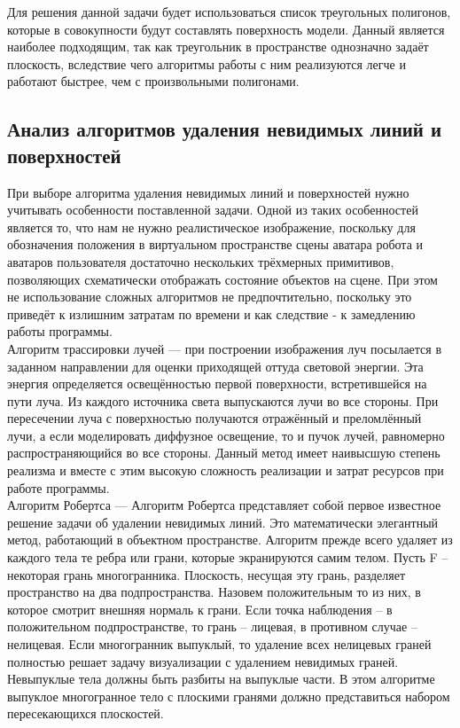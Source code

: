 Для решения данной задачи будет использоваться список треугольных полигонов, которые в совокупности будут составлять поверхность модели. Данный является наиболее подходящим, так как треугольник в пространстве однозначно задаёт плоскость, вследствие чего алгоритмы работы с ним реализуются легче и работают быстрее, чем с произвольными полигонами.

\subsection{Анализ алгоритмов удаления невидимых линий и поверхностей}

При выборе алгоритма удаления невидимых линий и поверхностей нужно учитывать особенности поставленной задачи. Одной из таких особенностей является то, что нам не нужно реалистическое изображение, поскольку для обозначения положения в виртуальном пространстве сцены аватара робота и аватаров пользователя достаточно нескольких трёхмерных примитивов, позволяющих схематически отображать состояние объектов на сцене. При этом не использование сложных алгоритмов не предпочтительно, поскольку это приведёт к излишним затратам по времени и как следствие - к замедлению работы программы.\\

Алгоритм трассировки лучей — при построении изображения луч посылается в заданном направлении для оценки приходящей оттуда световой энергии. Эта энергия определяется освещённостью первой поверхности, встретившейся на пути луча. Из каждого источника света выпускаются лучи во все стороны. При пересечении луча с поверхностью получаются отражённый и преломлённый лучи, а если моделировать диффузное освещение, то и пучок лучей, равномерно распространяющийся во все стороны. Данный метод имеет наивысшую степень реализма и вместе с этим высокую сложность реализации и затрат ресурсов при работе программы. \cite{cgshish}\\

Алгоритм Робертса — Алгоритм Робертса представляет собой первое известное решение задачи об удалении невидимых линий. Это математически элегантный метод, работающий в объектном пространстве. Алгоритм прежде всего удаляет из каждого тела те ребра или грани, которые экранируются самим телом. Пусть F – некоторая грань многогранника. Плоскость, несущая эту грань, разделяет пространство на два подпространства. Назовем положительным то из них, в которое смотрит внешняя нормаль к грани. Если точка наблюдения – в положительном подпространстве, то грань – лицевая, в противном случае – нелицевая. Если многогранник выпуклый, то удаление всех нелицевых граней полностью решает задачу визуализации с удалением невидимых граней. Невыпуклые тела должны быть разбиты на выпуклые части. В этом алгоритме выпуклое многогранное тело с плоскими гранями должно представиться набором пересекающихся плоскостей. \cite{cgshish}\\

